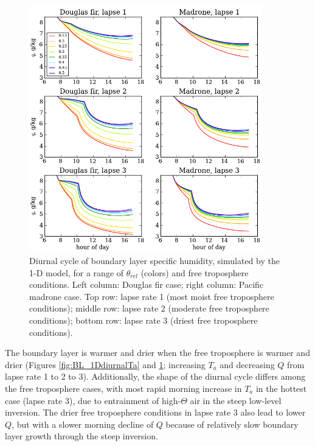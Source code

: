 \begin{figure}[here]
\includegraphics[width=0.9\textwidth]{ch2-BL/figures/testall_compare_sm_lapse_q_cropped.png}
\caption{Diurnal cycle of boundary layer specific humidity, simulated by the 1-D model, for a range of $\theta_{rel}$ (colors) and free troposphere conditions.  Left column: Douglas fir case; right column: Pacific madrone case.  Top row: lapse rate 1 (most moist free troposphere conditions); middle row: lapse rate 2 (moderate free troposphere conditions); bottom row: lapse rate 3 (driest free troposphere conditions).}
\label{fig:BL_1DdiurnalQ}
\end{figure}


The boundary layer is warmer and drier when the free troposphere is warmer and drier (Figures \ref{fig:BL_1DdiurnalTa} and \ref{fig:BL_1DdiurnalQ}; increasing $T_a$ and decreasing $Q$ from lapse rate 1 to 2 to 3).  Additionally, the shape of the diurnal cycle differs among the free troposphere cases, with most rapid morning increase in $T_a$ in the hottest case (lapse rate 3), due to entrainment of high-$\Theta$ air in the steep low-level inversion.  The drier free troposphere conditions in lapse rate 3 also lead to lower $Q$, but with a slower morning decline of $Q$ because of relatively slow boundary layer growth through the steep inversion.

